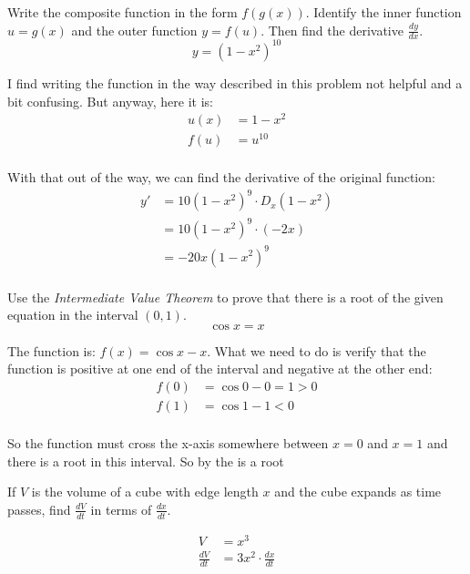 \documentclass[fleqn,addpoints]{exam}
\begin{document}
\begin{questions}
\question Write the composite function in the form $f(g(x))$. Identify the inner function $u = g(x)$ and the outer function $y =
f(u)$. Then find the derivative $\frac{dy}{dx}$.  
\[
   y = (1 - x^2)^{10}
\]

\begin{solution}
I find writing the function in the way described in this problem not helpful and a bit confusing.  But anyway, here it
is:
\begin{align*}
  u(x) &= 1 - x^2 \\
  f(u) &= u^{10} \\
\end{align*}

With that out of the way, we can find the derivative of the original function:
\begin{align*}
  y' &= 10(1 - x^2)^9 \cdot D_x (1 - x^2) \\
     &= 10(1 - x^2)^9 \cdot (-2x) \\
     &= -20x (1 - x^2)^9 \\
\end{align*}


\end{solution}

\ifprintanswers
\pagebreak
\fi

\question Use the {\em Intermediate Value Theorem} to prove that there is a root of the given equation in
the interval $(0, 1)$.
\[
  \cos x = x
\]

\begin{solution}
The function is: $f(x) = \cos x - x$.  What we need to do is verify that the function is positive at one end of the
interval and negative at the other end:
\begin{align*}
  f(0) &= \cos 0 - 0 = 1 > 0 \\
  f(1) &= \cos 1 - 1 < 0 \\
\end{align*}

So the function must cross the x-axis somewhere between $x = 0$ and $x = 1$ and there is a root in this interval.
So by the  is a root

\end{solution}

\question
If $V$ is the volume of a cube with edge length $x$ and the cube expands as time passes, find
$\frac{dV}{dt}$ in terms of $\frac{dx}{dt}$.

\begin{solution}
\begin{align*}
  V &= x^3 \\
  \frac{dV}{dt} &= 3x^2 \cdot \frac{dx}{dt} \\
\end{align*}


\end{solution}
\end{questions}
\end{document}

